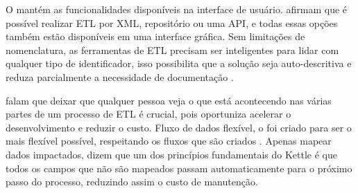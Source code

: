 O \pdi mantém as funcionalidades disponíveis na interface de usuário.  afirmam que é possível realizar ETL por XML, repositório ou uma API, e todas essas opções também estão disponíveis em uma interface gráfica. Sem limitações de nomenclatura, as ferramentas de ETL precisam ser inteligentes para lidar com qualquer tipo de identificador, isso possibilita que a solução seja auto-descritiva e reduza parcialmente a necessidade de documentação \citep{kettle}.

 falam que deixar que qualquer pessoa veja o que está acontecendo nas várias partes de um processo de ETL é crucial, pois oportuniza acelerar o desenvolvimento e reduzir o custo. Fluxo de dados flexível, o \pdi foi criado para ser o mais flexível possível, respeitando os fluxos que são criados \citep{kettle}. Apenas mapear dados impactados,  dizem que um dos princípios fundamentais do Kettle é que todos os campos que não são mapeados passam automaticamente para o próximo passo do processo, reduzindo assim o custo de manutenção.


